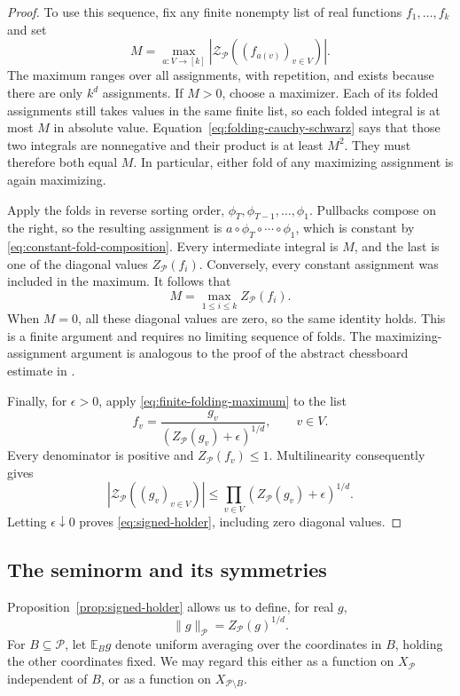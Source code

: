 \begin{proof}
To use this sequence, fix any finite nonempty list of real functions
\(f_1,\ldots,f_k\) and set
\[
 M=\max_{a:V\to[k]}
   \left|\mathcal Z_{\mathcal P}((f_{a(v)})_{v\in V})\right|.
\]
The maximum ranges over all assignments, with repetition, and exists
because there are only \(k^d\) assignments.  If \(M>0\), choose a
maximizer.  Each of its folded assignments still takes values in the
same finite list, so each folded integral is at most \(M\) in absolute
value.  Equation~\eqref{eq:folding-cauchy-schwarz} says that those two
integrals are nonnegative and their product is at least \(M^2\).
They must therefore both equal \(M\).  In particular, either fold of
any maximizing assignment is again maximizing.

Apply the folds in reverse sorting order,
\(\phi_T,\phi_{T-1},\ldots,\phi_1\).  Pullbacks compose on the
right, so the resulting assignment is
\(a\circ\phi_T\circ\cdots\circ\phi_1\), which is constant by
\eqref{eq:constant-fold-composition}.  Every intermediate integral is
\(M\), and the last is one of the diagonal values \(Z_{\mathcal P}(f_i)\).
Conversely, every constant assignment was included in the maximum.
It follows that
\begin{equation}
 M=\max_{1\le i\le k}Z_{\mathcal P}(f_i).
 \label{eq:finite-folding-maximum}
\end{equation}
When \(M=0\), all these diagonal values are zero, so the same identity
holds.  This is a finite argument and requires no limiting sequence of
folds. The maximizing-assignment argument is analogous to the proof of
the abstract chessboard estimate in
\cite[Theorem~4.1]{FILS1978ReflectionI}.

Finally, for \(\epsilon>0\), apply
\eqref{eq:finite-folding-maximum} to the list
\[
 f_v=\frac{g_v}{(Z_{\mathcal P}(g_v)+\epsilon)^{1/d}},
 \qquad v\in V.
\]
Every denominator is positive and \(Z_{\mathcal P}(f_v)\le1\).
Multilinearity consequently gives
\[
 \left|\mathcal Z_{\mathcal P}((g_v)_{v\in V})\right|
 \le\prod_{v\in V}(Z_{\mathcal P}(g_v)+\epsilon)^{1/d}.
\]
Letting \(\epsilon\downarrow0\) proves
\eqref{eq:signed-holder}, including zero diagonal values.
\end{proof}

\subsection{The seminorm and its symmetries}

Proposition~\ref{prop:signed-holder} allows us to define, for real \(g\),
\[
 \|g\|_{\mathcal P}=Z_{\mathcal P}(g)^{1/d}.
\]
For \(B\subseteq\mathcal P\), let \(\mathbb E_Bg\) denote
uniform averaging over the coordinates in \(B\), holding the other
coordinates fixed.  We may regard this either as a function on
\(X_{\mathcal P}\) independent of \(B\), or as a function on
\(X_{\mathcal P\setminus B}\).

